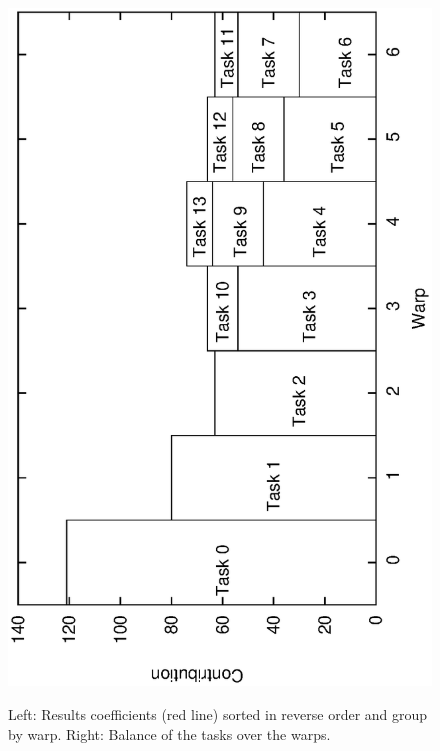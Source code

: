 \documentclass[oribibl]{llncs2e/llncs}
\begin{document}
\begin{figure}[t]
\begin{center}
{\includegraphics[scale=0.37, angle=-90]{warp.eps} 
}
\caption{Left: Results coefficients (red line) sorted in reverse order and group by warp. Right: Balance of the tasks over the warps.}
\label{algo_GPU}
\end{center}
\end{figure}
\end{document}

